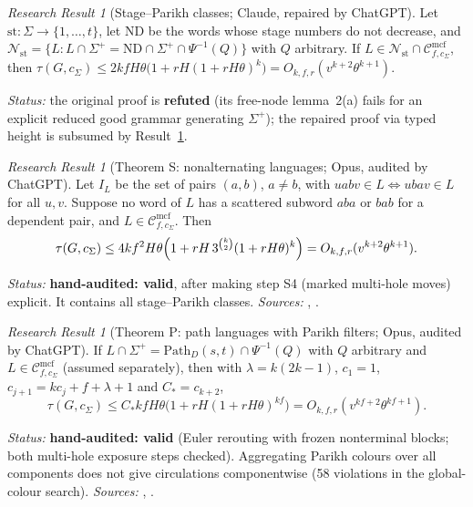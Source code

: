 \documentclass[11pt]{article}
\numberwithin{equation}{section}
\theoremstyle{plain}
\theoremstyle{definition}
\theoremstyle{remark}
\newtheorem{rresult}[theorem]{Research Result}
\newcommand{\Cmcf}[2]{\mathcal{C}^{\mathrm{mcf}}_{#1,#2}}
\theoremstyle{plain}
\begin{document}
\begin{rresult}[Stage--Parikh classes; Claude, repaired by ChatGPT]
\label{rr:stage-parikh}
Let $\mathrm{st}:\Sigma\to\{1,\ldots,t\}$, let $\mathrm{ND}$ be the words whose stage numbers do not
decrease, and $\mathcal N_{\mathrm{st}}=\{L:L\cap\Sigma^+=\mathrm{ND}\cap\Sigma^+\cap\Psi^{-1}(Q)\}$ with
$Q$ arbitrary.  If $L\in\mathcal N_{\mathrm{st}}\cap\Cmcf{f}{c_\Sigma}$, then
$\tau(G,c_\Sigma)\le2kfH\theta\bigl(1+rH(1+rH\theta)^k\bigr)=O_{k,f,r}(v^{k+2}\theta^{k+1})$.
\end{rresult}
\noindent\emph{Status:} the original proof is \textbf{refuted} (its free-node lemma~2(a)
fails for an explicit reduced good grammar generating $\Sigma^+$); the repaired proof via
typed height is subsumed by Result~\ref{rr:theorem-S}.

\begin{rresult}[Theorem S: nonalternating languages; Opus, audited by ChatGPT]
\label{rr:theorem-S}
Let $I_L$ be the set of pairs $(a,b)$, $a\ne b$, with $uabv\in L\iff ubav\in L$ for
all $u,v$.  Suppose no word of $L$ has a scattered subword $aba$ or $bab$ for a
dependent pair, and $L\in\Cmcf{f}{c_\Sigma}$.  Then
\[
 \tau(G,c_\Sigma)\le4kf^2H\theta\Bigl(1+rH\,3^{\binom k2}(1+rH\theta)^k\Bigr)
 =O_{k,f,r}(v^{k+2}\theta^{k+1}).
\]
\end{rresult}
\noindent\emph{Status:} \textbf{hand-audited: valid}, after making step S4 (marked
multi-hole moves) explicit.  It contains all stage--Parikh classes.  \emph{Sources:}
,
.

\begin{rresult}[Theorem P: path languages with Parikh filters; Opus, audited by ChatGPT]
\label{rr:theorem-P}
If $L\cap\Sigma^+=\mathrm{Path}_D(s,t)\cap\Psi^{-1}(Q)$ with $Q$ arbitrary and
$L\in\Cmcf{f}{c_\Sigma}$ (assumed separately), then with $\lambda=k(2k-1)$,
$c_1=1$, $c_{j+1}=kc_j+f+\lambda+1$ and $C_*=c_{k+2}$,
\[
 \tau(G,c_\Sigma)\le C_*kfH\theta\bigl(1+rH(1+rH\theta)^{kf}\bigr)
 =O_{k,f,r}(v^{kf+2}\theta^{kf+1}).
\]
\end{rresult}
\noindent\emph{Status:} \textbf{hand-audited: valid} (Euler rerouting with frozen
nonterminal blocks; both multi-hole exposure steps checked).  Aggregating Parikh colours
over all components does not give circulations componentwise (58 violations in the
global-colour search).  \emph{Sources:} ,
.
\end{document}
